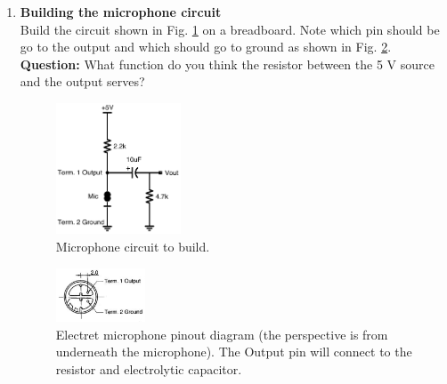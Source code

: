\documentclass[12pt]{article}
\begin{document}
\begin{enumerate}
\pagebreak

\item {\bf  Building the microphone circuit}\\
Build the circuit shown in Fig. \ref{fig:2} on a breadboard. 
Note which pin should be go to the output and which should go to ground as shown in Fig. \ref{fig:1}.\\
{\bf Question:} What function do you think the resistor between the 5 V source and the output serves? 

\begin{figure}[!h]
\begin{center}
\includegraphics[width=0.35\textwidth,trim=0 0 0 0,clip=false]{circuitdiagram.pdf}
\caption{Microphone circuit to build.}
\label{fig:2}
\end{center}
\end{figure}

\begin{figure}[!h]
\begin{center}
\includegraphics[width=0.25\textwidth,trim=0 0 0 0,clip=false]{electretpinout.png}
\caption{Electret microphone pinout diagram (the perspective is from underneath the microphone). 
The Output pin will connect to the resistor and electrolytic capacitor.}
\label{fig:1}
\end{center}
\end{figure}


\end{enumerate}
\end{document}
